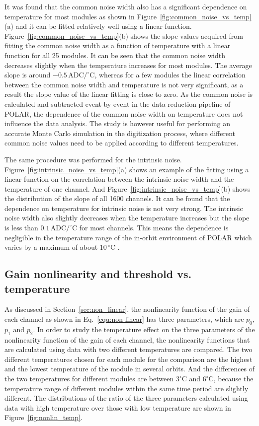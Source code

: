 \documentclass[preprint,sort&compress,12pt]{elsarticle}
\begin{document}
It was found that the common noise width also has a significant dependence on temperature for most modules as shown in Figure~\ref{fig:common_noise_vs_temp}(a) and it can be fitted relatively well using a linear function. Figure~\ref{fig:common_noise_vs_temp}(b) shows the slope values acquired from fitting the common noise width as a function of temperature with a linear function for all 25 modules. It can be seen that the common noise width decreases slightly when the temperature increases for most modules. The average slope is around $-0.5\,\mathrm{ADC}/^\circ\mathrm{C}$, whereas for a few modules the linear correlation between the common noise width and temperature is not very significant, as a result the slope value of the linear fitting is close to zero. As the common noise is calculated and subtracted event by event in the data reduction pipeline of POLAR, the dependence of the common noise width on temperature does not influence the data analysis. The study is however useful for performing an accurate Monte Carlo simulation in the digitization process, where different common noise values need to be applied according to different temperatures.

The same procedure was performed for the intrinsic noise. Figure~\ref{fig:intrinsic_noise_vs_temp}(a) shows an example of the fitting using a linear function on the correlation between the intrinsic noise width and the temperature of one channel. And Figure~\ref{fig:intrinsic_noise_vs_temp}(b) shows the distribution of the slope of all 1600 channels. It can be found that the dependence on temperature for intrinsic noise is not very strong. The intrinsic noise width also slightly decreases when the temperature increases but the slope is less than $0.1\,\mathrm{ADC}/^\circ\mathrm{C}$ for most channels. This means the dependence is negligible in the temperature range of the in-orbit environment of POLAR which varies by a maximum of about $10\,^\circ\mathrm{C}$ .

\subsection{Gain nonlinearity and threshold vs. temperature}

As discussed in Section~\ref{sec:non_linear}, the nonlinearity function of the gain of each channel as shown in Eq.~\eqref{equ:non-linear} has three parameters, which are $p_0$, $p_1$ and $p_2$. In order to study the temperature effect on the three parameters of the nonlinearity function of the gain of each channel, the nonlinearity functions that are calculated using data with two different temperatures are compared. The two different temperatures chosen for each module for the comparison are the highest and the lowest temperature of the module in several orbits. And the differences of the two temperatures for different modules are between $3^\circ\mathrm{C}$ and $6^\circ\mathrm{C}$, because the temperature range of different modules within the same time period are slightly different. The distributions of the ratio of the three parameters calculated using data with high temperature over those with low temperature are shown in Figure~\ref{fig:nonlin_temp}.
\end{document}
